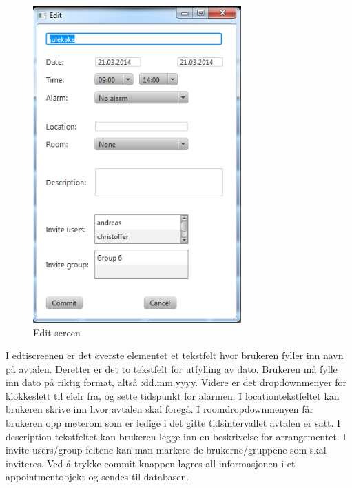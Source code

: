 \documentclass{article}
\begin{document}
\begin{figure}[h!] 
    \begin{center} 
        \includegraphics[width=8cm]{EditScreen.png}
        \caption{Edit screen}
    \label{edit}
    \end{center}
\end{figure}
I edtiscreenen er det øverste elementet et tekstfelt hvor brukeren fyller inn navn på avtalen. Deretter er det to tekstfelt for utfylling av dato. Brukeren må fylle inn dato på riktig format, altså :dd.mm.yyyy. Videre er det dropdownmenyer for klokkeslett til elelr fra, og sette tidspunkt for alarmen. I locationtekstfeltet kan brukeren skrive inn hvor avtalen skal foregå. I roomdropdownmenyen får brukeren opp møterom som er ledige i det gitte tidsintervallet avtalen er satt. I description-tekstfeltet kan brukeren legge inn en beskrivelse for arrangementet. I invite users/group-feltene kan man markere de brukerne/gruppene som skal inviteres. Ved å trykke commit-knappen  lagres all informasjonen i et appointmentobjekt og sendes til databasen.

\newpage
\end{document}
